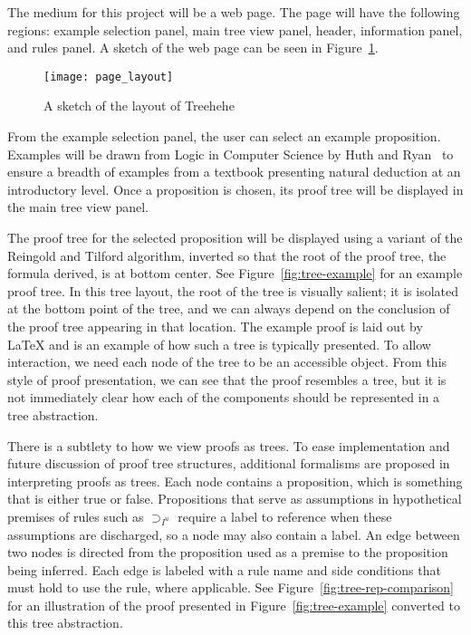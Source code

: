 \documentclass[12pt]{article}
\newcommand{\projectname}{Treehehe}
\begin{document}
The medium for this project will be a web page. The page will have the following regions: example selection panel, main tree view panel, header, information panel, and rules panel. A sketch of the web page can be seen in Figure~\ref{fig:sketchofpage}.

\begin{figure}

\begin{center}
\texttt{[image: page\_layout]}
\end{center}

\caption{A sketch of the layout of \projectname{}}
\label{fig:sketchofpage}
\end{figure}

From the example selection panel, the user can select an example proposition. Examples will be drawn from Logic in Computer Science by Huth and Ryan~\cite{logicincs-huth+ryan} to ensure a breadth of examples from a textbook presenting natural deduction at an introductory level. Once a proposition is chosen, its proof tree will be displayed in the main tree view panel.

The proof tree for the selected proposition will be displayed using a variant of the Reingold and Tilford algorithm, inverted so that the root of the proof tree, the formula derived, is at bottom center. See Figure~\ref{fig:tree-example} for an example proof tree. In this tree layout, the root of the tree is visually salient; it is isolated at the bottom point of the tree, and we can always depend on the conclusion of the proof tree appearing in that location. The example proof is laid out by \LaTeX{} and is an example of how such a tree is typically presented. To allow interaction, we need each node of the tree to be an accessible object. From this style of proof presentation, we can see that the proof resembles a tree, but it is not immediately clear how each of the components should be represented in a tree abstraction.

There is a subtlety to how we view proofs as trees. To ease implementation and future discussion of proof tree structures, additional formalisms are proposed in interpreting proofs as trees. Each node contains a proposition, which is something that is either true or false. Propositions that serve as assumptions in hypothetical premises of rules such as $\supset_{I^u}$ require a label to reference when these assumptions are discharged, so a node may also contain a label. An edge between two nodes is directed from the proposition used as a premise to the proposition being inferred. Each edge is labeled with a rule name and side conditions that must hold to use the rule, where applicable. See Figure~\ref{fig:tree-rep-comparison} for an illustration of the proof presented in Figure~\ref{fig:tree-example} converted to this tree abstraction.
\end{document}
